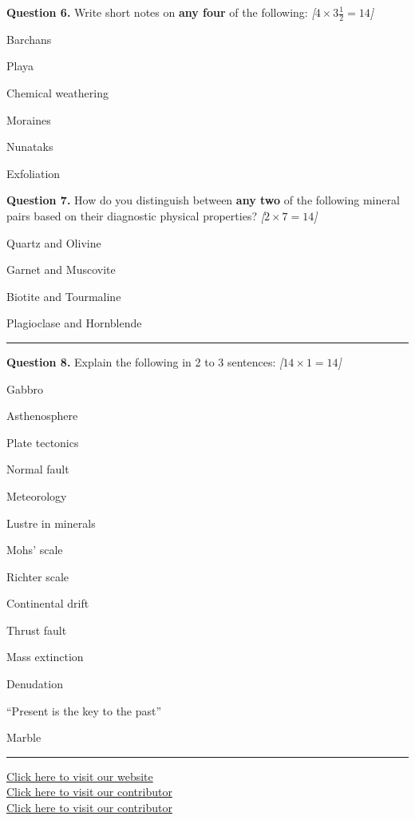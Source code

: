 \documentclass[11pt,a4paper]{article}
\newcommand{\pts}[1]{\hfill   \textit{[#1]}}
\begin{document}
\medskip


\noindent   \textbf{Question 6.} Write short notes on   \textbf{any four} of the following: \pts{$4  \times 3\frac{1}{2} = 14$}

\begin{parts}
  \item Barchans
  \item Playa
  \item Chemical weathering
  \item Moraines
  \item Nunataks
  \item Exfoliation
\end{parts}

\medskip


\noindent   \textbf{Question 7.} How do you distinguish between   \textbf{any two} of the following mineral pairs based on their diagnostic physical properties? \pts{$2  \times 7 = 14$}

\begin{parts}
  \item Quartz and Olivine
  \item Garnet and Muscovite
  \item Biotite and Tourmaline
  \item Plagioclase and Hornblende
\end{parts}

\bigskip


\rule{\linewidth}{0.4pt}\smallskip




\noindent   \textbf{Question 8.} Explain the following in 2 to 3 sentences: \pts{$14  \times 1 = 14$}

\begin{parts}
  \item Gabbro
  \item Asthenosphere
  \item Plate tectonics
  \item Normal fault
  \item Meteorology
  \item Lustre in minerals
  \item Mohs' scale
  \item Richter scale
  \item Continental drift
  \item Thrust fault
  \item Mass extinction
  \item Denudation
  \item ``Present is the key to the past''
  \item Marble
\end{parts}

\vfill\rule{\linewidth}{0.4pt}

\begin{center}\small
\href{https://bhu-exam.vercel.app/}{Click here to visit our website}\\[4pt]
\href{https://me-aryan.vercel.app/}{Click here to visit our contributor}\\[4pt]
\href{https://quashan-me.vercel.app/}{Click here to visit our contributor}
\end{center}
\end{document}
